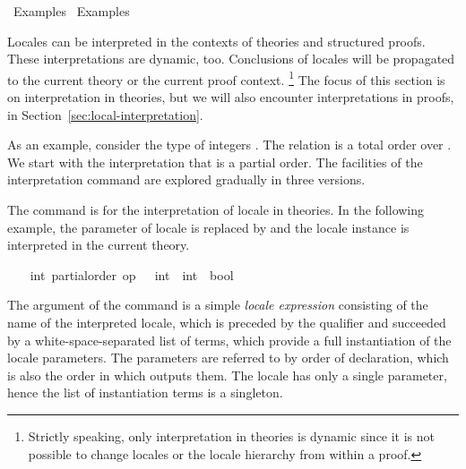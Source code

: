 %
\begin{isabellebody}%
\def\isabellecontext{Examples{\isadigit{1}}}%
%
\isadelimtheory
%
\endisadelimtheory
%
\isatagtheory
{}\isamarkupfalse%
\ Examples{}\isanewline
{}\ Examples\isanewline
{}%
\endisatagtheory
{\isafoldtheory}%
%
\isadelimtheory
%
\endisadelimtheory
%
\begin{isamarkuptext}%
\vspace{-5ex}%
\end{isamarkuptext}%
\isamarkuptrue%
%
\isamarkuptrue%
%
\begin{isamarkuptext}%
Locales can be interpreted in the contexts of theories and
  structured proofs.  These interpretations are dynamic, too.
  Conclusions of locales will be propagated to the current theory or
  the current proof context.%
\footnote{Strictly speaking, only interpretation in theories is
  dynamic since it is not possible to change locales or the locale
  hierarchy from within a proof.}
  The focus of this section is on
  interpretation in theories, but we will also encounter
  interpretations in proofs, in
  Section~\ref{sec:local-interpretation}.

  As an example, consider the type of integers .  The
  relation  is a total order over .  We start
  with the interpretation that  is a partial order.  The
  facilities of the interpretation command are explored gradually in
  three versions.%
\end{isamarkuptext}%
\isamarkuptrue%
%
\isamarkuptrue%
%
\begin{isamarkuptext}%
The command  is for the interpretation of
  locale in theories.  In the following example, the parameter of locale
   is replaced by  and the locale instance is interpreted in the current
  theory.%
\end{isamarkuptext}%
\isamarkuptrue%
%
\isadelimvisible
\ \ %
\endisadelimvisible
%
\isatagvisible
{}\isamarkupfalse%
\ int{\isacharcolon}\ partial{\isacharunderscore}order\ {\isachardoublequoteopen}op\ {\isasymle}\ {\isacharcolon}{\isacharcolon}\ int\ {\isasymRightarrow}\ int\ {\isasymRightarrow}\ bool{\isachardoublequoteclose}%
\begin{isamarkuptxt}%
\normalsize
  The argument of the command is a simple \emph{locale expression}
  consisting of the name of the interpreted locale, which is
  preceded by the qualifier  and succeeded by a
  white-space-separated list of terms, which provide a full
  instantiation of the locale parameters.  The parameters are referred
  to by order of declaration, which is also the order in which
   outputs them.  The locale has only a
  single parameter, hence the list of instantiation terms is a
  singleton.


\end{isamarkuptxt}
\end{isabellebody}
